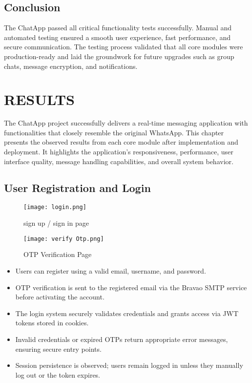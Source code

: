 \documentclass[12pt,a4paper]{report}
\begin{document}
\section{Conclusion}

The ChatApp  passed all critical functionality tests successfully. Manual and automated testing ensured a smooth user experience, fast performance, and secure communication. The testing process validated that all core modules were production-ready and laid the groundwork for future upgrades such as group chats, message encryption, and notifications.


\newpage








\chapter{RESULTS}

The ChatApp project successfully delivers a real-time messaging application with functionalities that closely resemble the original WhatsApp. This chapter presents the observed results from each core module after implementation and deployment. It highlights the application’s responsiveness, performance, user interface quality, message handling capabilities, and overall system behavior.

\section{User Registration and Login}

\begin{figure}[H]
    \centering
    \texttt{[image: login.png]}
    \caption{sign up  / sign in page}
\end{figure}

\begin{figure}[H]
    \centering
    \texttt{[image: verify Otp.png]}
    \caption{OTP Verification Page}
\end{figure}

\begin{itemize}
    \item Users can register using a valid email, username, and password.
    \item OTP verification is sent to the registered email via the Bravao SMTP service before activating the account.
    \item The login system securely validates credentials and grants access via JWT tokens stored in cookies.
    \item Invalid credentials or expired OTPs return appropriate error messages, ensuring secure entry points.
    \item Session persistence is observed; users remain logged in unless they manually log out or the token expires.
\end{itemize}
\end{document}
